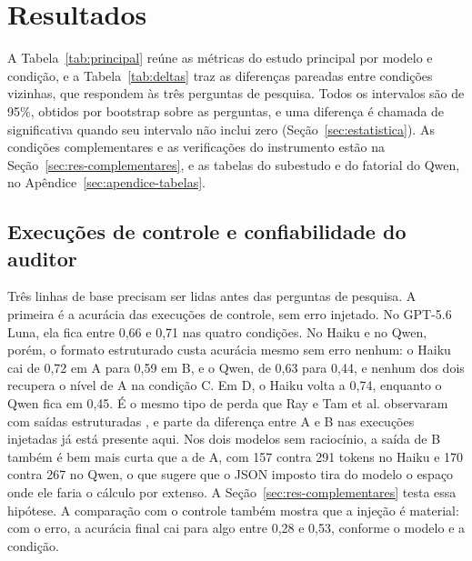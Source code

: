\section{Resultados}\label{sec:resultados}


A Tabela~\ref{tab:principal} reúne as métricas do estudo principal por modelo e condição, e a Tabela~\ref{tab:deltas} traz as diferenças pareadas entre condições vizinhas, que respondem às três perguntas de pesquisa.
Todos os intervalos são de 95\%, obtidos por bootstrap sobre as perguntas, e uma diferença é chamada de significativa quando seu intervalo não inclui zero (Seção~\ref{sec:estatistica}).
As condições complementares e as verificações do instrumento estão na Seção~\ref{sec:res-complementares}, e as tabelas do subestudo e do fatorial do Qwen, no Apêndice~\ref{sec:apendice-tabelas}.




\subsection{Execuções de controle e confiabilidade do auditor}\label{sec:res-controle}

Três linhas de base precisam ser lidas antes das perguntas de pesquisa.
A primeira é a acurácia das execuções de controle, sem erro injetado.
No GPT-5.6 Luna, ela fica entre 0,66 e 0,71 nas quatro condições.
No Haiku e no Qwen, porém, o formato estruturado custa acurácia mesmo sem erro nenhum: o Haiku cai de 0,72 em A para 0,59 em B, e o Qwen, de 0,63 para 0,44, e nenhum dos dois recupera o nível de A na condição C.
Em D, o Haiku volta a 0,74, enquanto o Qwen fica em 0,45.
É o mesmo tipo de perda que Ray e Tam et al. observaram com saídas estruturadas \cite{ray2026constraint, tam2024speak}, e parte da diferença entre A e B nas execuções injetadas já está presente aqui.
Nos dois modelos sem raciocínio, a saída de B também é bem mais curta que a de A, com 157 contra 291 tokens no Haiku e 170 contra 267 no Qwen, o que sugere que o JSON imposto tira do modelo o espaço onde ele faria o cálculo por extenso. A Seção~\ref{sec:res-complementares} testa essa hipótese.
A comparação com o controle também mostra que a injeção é material: com o erro, a acurácia final cai para algo entre 0,28 e 0,53, conforme o modelo e a condição.

